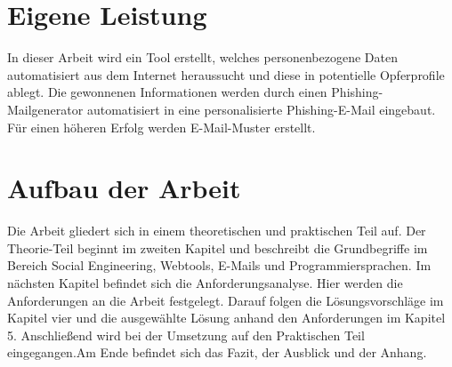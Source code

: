 

 	
\section{Eigene Leistung}
\label {sec:Eigene Leistung} 
In dieser Arbeit wird ein Tool erstellt, welches personenbezogene Daten automatisiert aus dem Internet heraussucht und diese in potentielle Opferprofile ablegt. Die gewonnenen Informationen werden durch einen Phishing-Mailgenerator automatisiert in eine personalisierte Phishing-E-Mail eingebaut. Für einen höheren Erfolg werden E-Mail-Muster erstellt.

\section{Aufbau der Arbeit}
\label {sec:Aufbau der Arbeit} 
Die Arbeit gliedert sich in einem theoretischen und praktischen Teil auf. Der Theorie-Teil beginnt im zweiten Kapitel und beschreibt die Grundbegriffe im Bereich Social Engineering, Webtools, E-Mails und Programmiersprachen. Im nächsten Kapitel befindet sich die Anforderungsanalyse. Hier werden die Anforderungen an die Arbeit festgelegt. Darauf folgen die Lösungsvorschläge im Kapitel vier und die ausgewählte Lösung anhand den Anforderungen im Kapitel 5. Anschließend wird bei der Umsetzung auf den Praktischen Teil eingegangen.Am Ende befindet sich das Fazit, der Ausblick und der Anhang.






